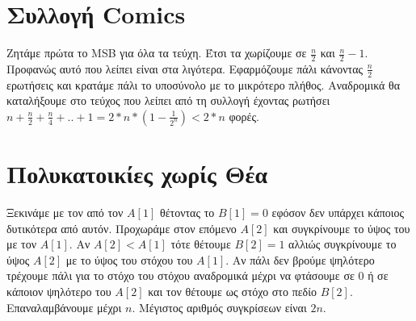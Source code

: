 \documentclass[a4paper,10pt]{article} \usepackage{anysize}
\begin{document}
\section{Συλλογή Comics}
Ζητάμε πρώτα το MSB για όλα τα τεύχη. Έτσι τα χωρίζουμε σε $\frac{n}{2}$ και
$\frac{n}{2}-1$. Προφανώς αυτό που λείπει είναι στα λιγότερα. Εφαρμόζουμε πάλι
κάνοντας $\frac{n}{2}$ ερωτήσεις και κρατάμε πάλι το υποσύνολο με το μικρότερο
πλήθος. Αναδρομικά θα καταλήξουμε στο τεύχος που λείπει από τη συλλογή έχοντας
ρωτήσει $n+\frac{n}{2}+\frac{n}{4}+..+1=2*n*(1-\frac{1}{2^n}) < 2*n$ φορές.
\section{Πολυκατοικίες χωρίς Θέα}
Ξεκινάμε με τον από τον $A[1]$ θέτοντας το $B[1]=0$ εφόσον δεν υπάρχει κάποιος
δυτικότερα από αυτόν. Προχωράμε στον επόμενο $A[2]$ και συγκρίνουμε το ύψος
του με τον $A[1]$. Αν $A[2]<A[1]$ τότε θέτουμε $B[2]=1$ αλλιώς συγκρίνουμε το
ύψος $A[2]$ με το ύψος του στόχου του $A[1]$. Αν πάλι δεν βρούμε ψηλότερο
τρέχουμε πάλι για το στόχο του στόχου αναδρομικά μέχρι να φτάσουμε σε 0
ή σε κάποιον ψηλότερο του $A[2]$ και τον θέτουμε ως στόχο στο πεδίο $B[2]$.
Επαναλαμβάνουμε μέχρι $n$. Μέγιστος αριθμός συγκρίσεων είναι $2n$.
\end{document}
